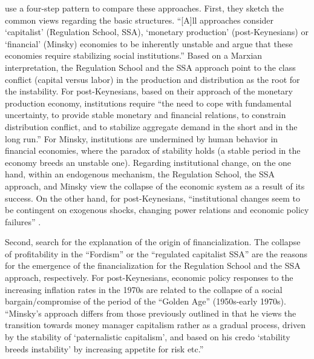 \documentclass[a4paper, twoside]{templates/ociamthesis}
\begin{document}
\textcite{hein2015c} use a four-step pattern to compare these approaches. First, they sketch the common views regarding the basic structures. ``{[}A{]}ll approaches consider `capitalist' (Regulation School, SSA), `monetary production' (post-Keynesians) or `financial' (Minsky) economies to be inherently unstable and argue that these economies require stabilizing social institutions.'' \autocite[ 43]{hein2015c} Based on a Marxian interpretation, the Regulation School and the SSA approach point to the class conflict (capital versus labor) in the production and distribution as the root for the instability. For post-Keynesians, based on their approach of the monetary production economy, institutions require ``the need to cope with fundamental uncertainty, to provide stable monetary and financial relations, to constrain distribution conflict, and to stabilize aggregate demand in the short and in the long run.'' \autocite[ 43]{hein2015c} For Minsky, institutions are undermined by human behavior in financial economies, where the paradox of stability holds (a stable period in the economy breeds an unstable one). Regarding institutional change, on the one hand, within an endogenous mechanism, the Regulation School, the SSA approach, and Minsky view the collapse of the economic system as a result of its success. On the other hand, for post-Keynesians, ``institutional changes seem to be contingent on exogenous shocks, changing power relations and economic policy failures'' \autocite[ 43]{hein2015c}.

Second, \textcite{hein2015c} search for the explanation of the origin of financialization. The collapse of profitability in the ``Fordism'' or the ``regulated capitalist SSA'' are the reasons for the emergence of the financialization for the Regulation School and the SSA approach, respectively. For post-Keynesians, economic policy responses to the increasing inflation rates in the 1970s are related to the collapse of a social bargain/compromise of the period of the ``Golden Age'' (1950s-early 1970s). ``Minsky's approach differs from those previously outlined in that he views the transition towards money manager capitalism rather as a gradual process, driven by the stability of `paternalistic capitalism', and based on his credo `stability breeds instability' by increasing appetite for risk etc.'' \autocite[ 44]{hein2015c}
\end{document}
